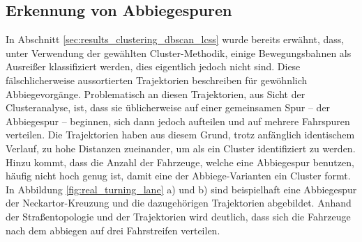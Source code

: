 \subsection{Erkennung von Abbiegespuren}
\label{sec:real_detect_turning_lane}

In Abschnitt \ref{sec:results_clustering_dbscan_lcss} wurde bereits erwähnt, dass, unter Verwendung der
gewählten Cluster-Methodik, einige Bewegungsbahnen als Ausreißer klassifiziert werden, dies eigentlich jedoch
nicht sind. Diese fälschlicherweise aussortierten Trajektorien beschreiben für gewöhnlich Abbiegevorgänge.
Problematisch an diesen Trajektorien, aus Sicht der Clusteranalyse, ist, dass sie üblicherweise auf einer
gemeinsamen Spur -- der Abbiegespur -- beginnen, sich dann jedoch aufteilen und auf mehrere Fahrspuren verteilen.
Die Trajektorien haben aus diesem Grund, trotz anfänglich identischem Verlauf, zu hohe Distanzen zueinander, um
als ein Cluster identifiziert zu werden. Hinzu kommt, dass die Anzahl der Fahrzeuge, welche eine Abbiegespur
benutzen, häufig nicht hoch genug ist, damit eine der Abbiege-Varianten ein Cluster formt.
In Abbildung \ref{fig:real_turning_lane} a) und b) sind beispielhaft eine Abbiegespur der Neckartor-Kreuzung und
die dazugehörigen Trajektorien abgebildet. Anhand der Straßentopologie und der Trajektorien wird deutlich,
dass sich die Fahrzeuge nach dem abbiegen auf drei Fahrstreifen verteilen.

